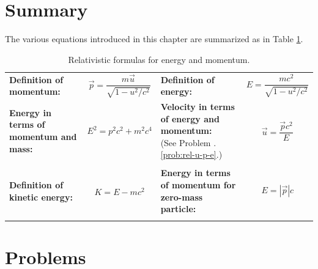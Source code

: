 \section{Summary}
The various equations introduced in this chapter are summarized as
in Table \ref{table:rel-defs}.

\begin{table}[h]
\begin{small}
\caption{Relativistic formulas for energy and momentum.}
\label{table:rel-defs}
\begin{tabular}{|lclc|} \hline
\parbox{3.0cm}{\raggedright{\bf Definition of momentum:}}   &  
       \parbox{3.cm}{\[ \vec p =\frac{m\vec u}{\sqrt{1-u^2/c^2}} \]} & 
\parbox{3.0cm}{\raggedright{\bf Definition of energy:}} & 
       \parbox{3.cm}{\[ E =\frac{mc^2}{\sqrt{1-u^2/c^2}} \]} \\
\parbox{3.0cm}{\raggedright {\bf Energy in terms of momentum and mass:}}   &  
       \parbox{3.cm}{\[ E^2 = p^2c^2 + m^2c^4\]} & 
\parbox{3.0cm}{\raggedright{\bf Velocity in terms of energy and momentum:}\\
       (See Problem .\ref{prob:rel-u-p-e}.)} & 
       \parbox{3.cm}{\[ \vec{u} = \frac{\vec{p}c^2}{E} \]} \\
       & & & \\
\parbox{3.0cm}{\raggedright{\bf Definition of kinetic energy:}}   &  
       \parbox{3.cm}{\[ K = E - mc^2 \]} & 
\parbox{3.0cm}{\raggedright{\bf Energy in terms of momentum for 
zero-mass particle:}} & 
       \parbox{3.cm}{\[ E = \left|\vec{p}\right|c \]} \\
&  & & \\ \hline
\end{tabular}
\end{small}
\end{table}

\newpage

\section*{Problems}

